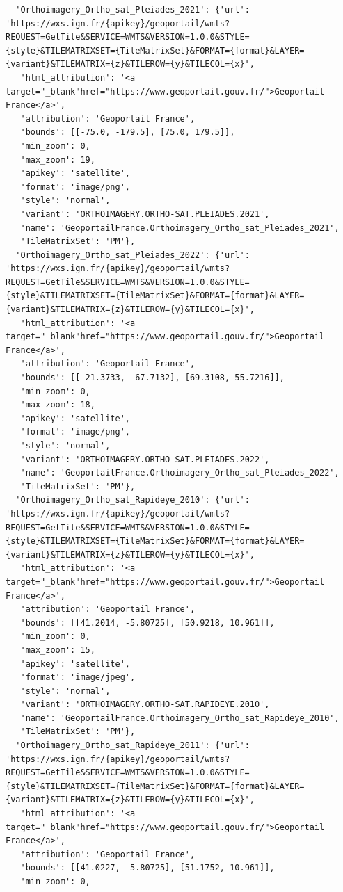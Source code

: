 \documentclass[
  letterpaper,
  DIV=11,
  numbers=noendperiod]{scrreprt}
\begin{document}
\begin{verbatim}
  'Orthoimagery_Ortho_sat_Pleiades_2021': {'url': 'https://wxs.ign.fr/{apikey}/geoportail/wmts?REQUEST=GetTile&SERVICE=WMTS&VERSION=1.0.0&STYLE={style}&TILEMATRIXSET={TileMatrixSet}&FORMAT={format}&LAYER={variant}&TILEMATRIX={z}&TILEROW={y}&TILECOL={x}',
   'html_attribution': '<a target="_blank"href="https://www.geoportail.gouv.fr/">Geoportail France</a>',
   'attribution': 'Geoportail France',
   'bounds': [[-75.0, -179.5], [75.0, 179.5]],
   'min_zoom': 0,
   'max_zoom': 19,
   'apikey': 'satellite',
   'format': 'image/png',
   'style': 'normal',
   'variant': 'ORTHOIMAGERY.ORTHO-SAT.PLEIADES.2021',
   'name': 'GeoportailFrance.Orthoimagery_Ortho_sat_Pleiades_2021',
   'TileMatrixSet': 'PM'},
  'Orthoimagery_Ortho_sat_Pleiades_2022': {'url': 'https://wxs.ign.fr/{apikey}/geoportail/wmts?REQUEST=GetTile&SERVICE=WMTS&VERSION=1.0.0&STYLE={style}&TILEMATRIXSET={TileMatrixSet}&FORMAT={format}&LAYER={variant}&TILEMATRIX={z}&TILEROW={y}&TILECOL={x}',
   'html_attribution': '<a target="_blank"href="https://www.geoportail.gouv.fr/">Geoportail France</a>',
   'attribution': 'Geoportail France',
   'bounds': [[-21.3733, -67.7132], [69.3108, 55.7216]],
   'min_zoom': 0,
   'max_zoom': 18,
   'apikey': 'satellite',
   'format': 'image/png',
   'style': 'normal',
   'variant': 'ORTHOIMAGERY.ORTHO-SAT.PLEIADES.2022',
   'name': 'GeoportailFrance.Orthoimagery_Ortho_sat_Pleiades_2022',
   'TileMatrixSet': 'PM'},
  'Orthoimagery_Ortho_sat_Rapideye_2010': {'url': 'https://wxs.ign.fr/{apikey}/geoportail/wmts?REQUEST=GetTile&SERVICE=WMTS&VERSION=1.0.0&STYLE={style}&TILEMATRIXSET={TileMatrixSet}&FORMAT={format}&LAYER={variant}&TILEMATRIX={z}&TILEROW={y}&TILECOL={x}',
   'html_attribution': '<a target="_blank"href="https://www.geoportail.gouv.fr/">Geoportail France</a>',
   'attribution': 'Geoportail France',
   'bounds': [[41.2014, -5.80725], [50.9218, 10.961]],
   'min_zoom': 0,
   'max_zoom': 15,
   'apikey': 'satellite',
   'format': 'image/jpeg',
   'style': 'normal',
   'variant': 'ORTHOIMAGERY.ORTHO-SAT.RAPIDEYE.2010',
   'name': 'GeoportailFrance.Orthoimagery_Ortho_sat_Rapideye_2010',
   'TileMatrixSet': 'PM'},
  'Orthoimagery_Ortho_sat_Rapideye_2011': {'url': 'https://wxs.ign.fr/{apikey}/geoportail/wmts?REQUEST=GetTile&SERVICE=WMTS&VERSION=1.0.0&STYLE={style}&TILEMATRIXSET={TileMatrixSet}&FORMAT={format}&LAYER={variant}&TILEMATRIX={z}&TILEROW={y}&TILECOL={x}',
   'html_attribution': '<a target="_blank"href="https://www.geoportail.gouv.fr/">Geoportail France</a>',
   'attribution': 'Geoportail France',
   'bounds': [[41.0227, -5.80725], [51.1752, 10.961]],
   'min_zoom': 0,

\end{verbatim}
\end{document}
